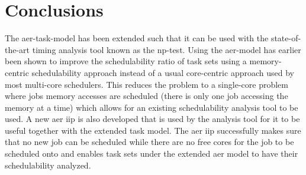 \documentclass{kththesis}
\begin{document}










\section{Conclusions}

The \acrshort{aer}-task-model has been extended such that it can be used with the state-of-the-art
timing analysis tool known as the \acrshort{np}-test. Using the \acrshort{aer}-model has earlier
been shown to improve the schedulability ratio of task sets using a memory-centric schedulability
approach instead of a usual core-centric approach used by most multi-core schedulers. This reduces
the problem to a single-core problem where jobs memory accesses are scheduled (there is only one job
accessing the memory at a time) which allows for an existing schedulability analysis tool to be
used. A new \acrshort{aer} \acrshort{iip} is also developed that is used by the analysis tool for it
to be useful together with the extended task model. The \acrshort{aer} \acrshort{iip} successfully
makes sure that no new job can be scheduled while there are no free cores for the job to be
scheduled onto and enables task sets under the extended \acrshort{aer} model to have their
schedulability analyzed. 
\end{document}
